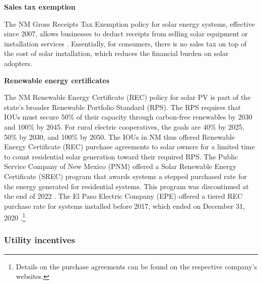 \documentclass[11pt,twoside,letterpaper]{article}
\begin{document}
\noindent\textbf{Sales tax exemption}

The NM Gross Receipts Tax Exemption policy for solar energy systems, effective since 2007, allows businesses to deduct receipts from selling solar equipment or installation services \parencite{NMStat2021}. Essentially, for consumers, there is no sales tax on top of the cost of solar installation, which reduces the financial burden on solar adopters.


\noindent\textbf{Renewable energy certificates}

The NM Renewable Energy Certificate (REC) policy for solar PV is part of the state's broader Renewable Portfolio Standard (RPS). The RPS requires that IOUs must secure 50\% of their capacity through carbon-free renewables by 2030 and 100\% by 2045. For rural electric cooperatives, the goals are 40\% by 2025, 50\% by 2030, and 100\% by 2050. The IOUs in NM thus offered Renewable Energy Certificate (REC) purchase agreements to solar owners for a limited time to count residential solar generation toward their required RPS. The Public Service Company of New Mexico (PNM) offered a Solar Renewable Energy Certificate (SREC) program that awards systems a stepped purchased rate for the energy generated for residential systems. This program was discontinued at the end of 2022 \parencite{pnmrec}. The El Paso Electric Company (EPE) offered a tiered REC purchase rate for systems installed before 2017, which ended on December 31, 2020 \parencite{eperec, eperecmid}.\footnote{Details on the purchase agreements can be found on the respective company's websites.}

\subsubsection{Utility incentives}
\end{document}
